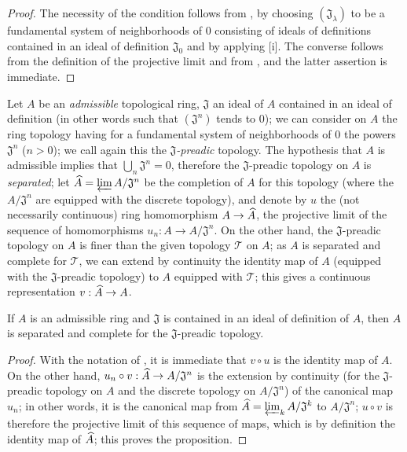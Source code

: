 \begin{proof}
\label{proof-0.7.2.2}
The necessity of the condition follows from , by choosing
$(\mathfrak{J}_\lambda)$ to be a fundamental system of neighborhoods of $0$
consisting of ideals of definitions contained in an ideal of definition
$\mathfrak{J}_0$ and by applying [i]. The converse follows
from the definition of the projective limit and from , and the
latter assertion is immediate.
\end{proof}

\begin{env}[7.2.3]
\label{0.7.2.3}
Let $A$ be an \emph{admissible} topological ring, $\mathfrak{J}$ an ideal of $A$
contained in an ideal of definition (in other words  such that
$(\mathfrak{J}^n)$ tends to $0$); we can consider on $A$ the ring topology
having for a fundamental system of neighborhoods of $0$ the powers
$\mathfrak{J}^n$ ($n>0$); we call again this the \emph{$\mathfrak{J}$-preadic}
topology. The hypothesis that $A$ is admissible implies that
$\bigcup_n\mathfrak{J}^n=0$, therefore the $\mathfrak{J}$-preadic topology on
$A$ is \emph{separated}; let $\widehat{A}=\varprojlim A/\mathfrak{J}^n$ be the
completion of $A$ for this topology (where the $A/\mathfrak{J}^n$ are equipped
with the discrete topology), and denote by $u$ the (not necessarily continuous)
ring homomorphism $A\to\wh{A}$, the projective limit of the sequence of
homomorphisms $u_n:A\to A/\mathfrak{J}^n$. On the other hand, the
$\mathfrak{J}$-preadic topology on $A$ is finer than the given topology
$\mathcal{T}$ on $A$; as $A$ is separated and complete for $\mathcal{T}$, we can
extend by continuity the identity map of $A$ (equipped with the
$\mathfrak{J}$-preadic topology) to $A$ equipped with $\mathcal{T}$; this
gives a continuous representation $v:\wh{A}\to A$.
\end{env}

\begin{proposition}[7.2.4]
\label{0.7.2.4}
If $A$ is an admissible ring and $\mathfrak{J}$ is contained in an ideal of
definition of $A$, then $A$ is separated and complete for the
$\mathfrak{J}$-preadic topology.
\end{proposition}

\begin{proof}
\label{proof-0.7.2.4}
With the notation of , it is immediate that
$v\circ u$ is the identity map of $A$. On the other hand,
$u_n\circ v:\wh{A}\to A/\mathfrak{J}^n$ is the extension by continuity (for
the $\mathfrak{J}$-preadic topology on $A$ and the discrete topology on
$A/\mathfrak{J}^n$) of the canonical map $u_n$; in other words, it is the
canonical map from $\widehat{A}=\varprojlim_k A/\mathfrak{J}^k$ to
$A/\mathfrak{J}^n$; $u\circ v$ is therefore the projective limit of this
sequence of maps, which is by definition the identity map of
$\widehat{A}$; this proves the proposition.
\end{proof}

